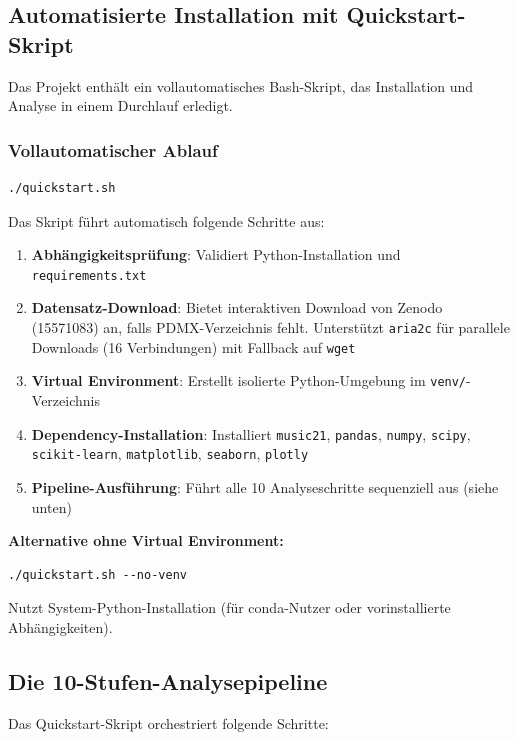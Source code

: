 \documentclass[12pt,a4paper]{article}
\theoremstyle{definition}
\begin{document}
\subsection{Automatisierte Installation mit Quickstart-Skript}

Das Projekt enthält ein vollautomatisches Bash-Skript, das Installation und Analyse in einem Durchlauf erledigt.

\subsubsection{Vollautomatischer Ablauf}

\begin{lstlisting}
./quickstart.sh
\end{lstlisting}

Das Skript führt automatisch folgende Schritte aus:
\begin{enumerate}
    \item \textbf{Abhängigkeitsprüfung}: Validiert Python-Installation und \texttt{requirements.txt}
    \item \textbf{Datensatz-Download}: Bietet interaktiven Download von Zenodo (15571083) an, falls PDMX-Verzeichnis fehlt. Unterstützt \texttt{aria2c} für parallele Downloads (16 Verbindungen) mit Fallback auf \texttt{wget}
    \item \textbf{Virtual Environment}: Erstellt isolierte Python-Umgebung im \texttt{venv/}-Verzeichnis
    \item \textbf{Dependency-Installation}: Installiert \texttt{music21}, \texttt{pandas}, \texttt{numpy}, \texttt{scipy}, \texttt{scikit-learn}, \texttt{matplotlib}, \texttt{seaborn}, \texttt{plotly}
    \item \textbf{Pipeline-Ausführung}: Führt alle 10 Analyseschritte sequenziell aus (siehe unten)
\end{enumerate}

\textbf{Alternative ohne Virtual Environment:}
\begin{lstlisting}
./quickstart.sh --no-venv
\end{lstlisting}
Nutzt System-Python-Installation (für conda-Nutzer oder vorinstallierte Abhängigkeiten).

\subsection{Die 10-Stufen-Analysepipeline}

Das Quickstart-Skript orchestriert folgende Schritte:
\end{document}
